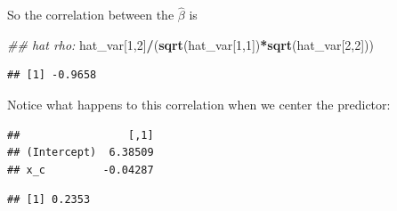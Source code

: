 \documentclass[12pt,]{krantz}
\newenvironment{Shaded}{\begin{snugshade}}{\end{snugshade}}
\newcommand{\CommentTok}[1]{\textcolor[rgb]{0.56,0.35,0.01}{\textit{#1}}}
\newcommand{\DataTypeTok}[1]{\textcolor[rgb]{0.13,0.29,0.53}{#1}}
\newcommand{\DecValTok}[1]{\textcolor[rgb]{0.00,0.00,0.81}{#1}}
\newcommand{\KeywordTok}[1]{\textcolor[rgb]{0.13,0.29,0.53}{\textbf{#1}}}
\newcommand{\NormalTok}[1]{#1}
\newcommand{\OperatorTok}[1]{\textcolor[rgb]{0.81,0.36,0.00}{\textbf{#1}}}
\newcommand{\OtherTok}[1]{\textcolor[rgb]{0.56,0.35,0.01}{#1}}
\begin{document}
So the correlation between the \(\hat\beta\) is

\begin{Shaded}
\begin{Highlighting}[]
\CommentTok{## hat rho:}
\NormalTok{hat_var[}\DecValTok{1}\NormalTok{,}\DecValTok{2}\NormalTok{]}\OperatorTok{/}\NormalTok{(}\KeywordTok{sqrt}\NormalTok{(hat_var[}\DecValTok{1}\NormalTok{,}\DecValTok{1}\NormalTok{])}\OperatorTok{*}\KeywordTok{sqrt}\NormalTok{(hat_var[}\DecValTok{2}\NormalTok{,}\DecValTok{2}\NormalTok{]))}
\end{Highlighting}
\end{Shaded}

\begin{verbatim}
## [1] -0.9658
\end{verbatim}

Notice what happens to this correlation when we center the predictor:

\begin{Shaded}
\end{Shaded}

\begin{verbatim}
##                 [,1]
## (Intercept)  6.38509
## x_c         -0.04287
\end{verbatim}

\begin{Shaded}
\end{Shaded}

\begin{verbatim}
## [1] 0.2353
\end{verbatim}
\end{document}
